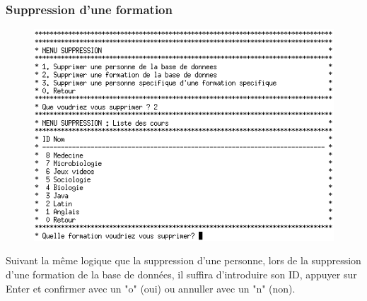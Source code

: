 \documentclass[11pt]{article}
\begin{document}
\newpage
\subsubsection{Suppression d'une formation}
\begin{figure}[ht]
  \centering
  \includegraphics[trim=0 0 0 0, clip, scale=0.8]{images/18.png.png}
\end{figure}
Suivant la même logique que la suppression d'une personne, lors de la suppression d'une formation de la base de données, il suffira d'introduire son ID, appuyer sur Enter et confirmer avec un "o" (oui) ou annuller avec un "n" (non). 

\newpage
\end{document}
